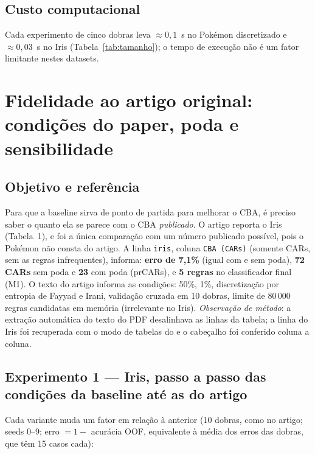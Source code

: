 \documentclass[a4paper,11pt]{article}
\newcommand{\code}[1]{\texttt{\detokenize{#1}}}
\begin{document}
\subsection{Custo computacional}
Cada experimento de cinco dobras leva $\approx 0{,}1$~s no Pok\'emon discretizado e $\approx 0{,}03$~s no Iris (Tabela~\ref{tab:tamanho}); o tempo de execu\c{c}\~ao n\~ao \'e um fator limitante nestes datasets.

\section{Fidelidade ao artigo original: condições do paper, poda e sensibilidade}\label{sec:fidelidade}

\subsection{Objetivo e referência}
Para que a baseline sirva de ponto de partida para melhorar o CBA, é preciso saber o quanto ela se parece com o CBA \emph{publicado}. O artigo reporta o Iris (Tabela~1), e foi a única comparação com um número publicado possível, pois o Pokémon não consta do artigo. A linha \texttt{iris}, coluna \texttt{CBA (CARs)} (somente CARs, sem as regras infrequentes), informa: \textbf{erro de 7,1\%} (igual com e sem poda), \textbf{72 CARs} sem poda e \textbf{23} com poda (prCARs), e \textbf{5 regras} no classificador final (M1). O texto do artigo informa as condições: \code{minconf} 50\%, \code{minsup} 1\%, discretização por entropia de Fayyad e Irani, validação cruzada em 10 dobras, limite de 80\,000 regras candidatas em memória (irrelevante no Iris). \emph{Observação de método}: a extração automática do texto do PDF desalinhava as linhas da tabela; a linha do Iris foi recuperada com o modo de tabelas do \code{pdftotext} e o cabeçalho foi conferido coluna a coluna.

\subsection{Experimento 1 --- Iris, passo a passo das condições da baseline até as do artigo}
Cada variante muda um fator em relação à anterior (10 dobras, como no artigo; seeds 0--9; erro $=1-$ acurácia OOF, equivalente à média dos erros das dobras, que têm 15 casos cada):


\end{document}
